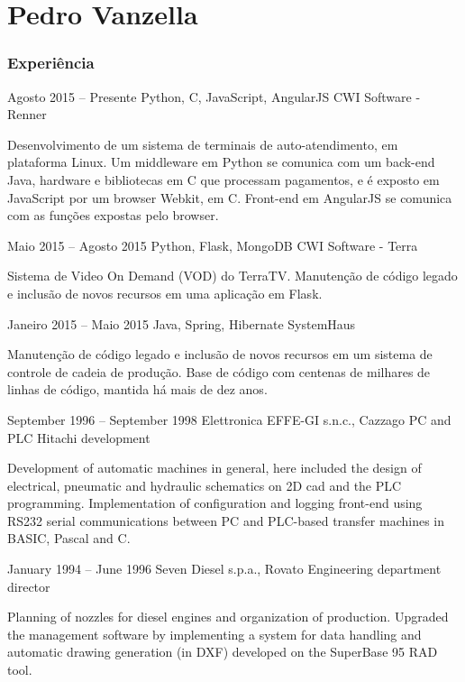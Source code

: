 \documentclass{tccv}
\begin{document}
\part{Pedro Vanzella}

\section{Experiência}

\begin{eventlist}

\item{Agosto 2015 -- Presente}
     {Python, C, JavaScript, AngularJS}
     {CWI Software - Renner}

Desenvolvimento de um sistema de terminais de auto-atendimento, em plataforma
Linux. Um middleware em Python se comunica com um back-end Java, hardware e
bibliotecas em C que processam pagamentos, e é exposto em JavaScript por um
browser Webkit, em C. Front-end em AngularJS se comunica com as funções expostas
pelo browser.

\item{Maio 2015 -- Agosto 2015}
     {Python, Flask, MongoDB}
     {CWI Software - Terra}

Sistema de Video On Demand (VOD) do TerraTV. Manutenção de código legado e inclusão
de novos recursos em uma aplicação em Flask.

\item{Janeiro 2015 -- Maio 2015}
     {Java, Spring, Hibernate}
     {SystemHaus}

Manutenção de código legado e inclusão de novos recursos em um sistema de
controle de cadeia de produção. Base de código com centenas de milhares de
linhas de código, mantida há mais de dez anos.

\item{September 1996 -- September 1998}
     {Elettronica EFFE-GI s.n.c., Cazzago}
     {PC and PLC Hitachi development}

Development of automatic machines in general, here included the design
of electrical, pneumatic and hydraulic schematics on 2D cad and the PLC
programming. Implementation of configuration and logging front-end using
RS232 serial communications between PC and PLC-based transfer machines
in BASIC, Pascal and C.

\item{January 1994 -- June 1996}
     {Seven Diesel s.p.a., Rovato}
     {Engineering department director}

Planning of nozzles for diesel engines and organization of production.
Upgraded the management software by implementing a system for data
handling and automatic drawing generation (in DXF) developed on the
SuperBase 95 RAD tool.

\end{eventlist}
\end{document}
